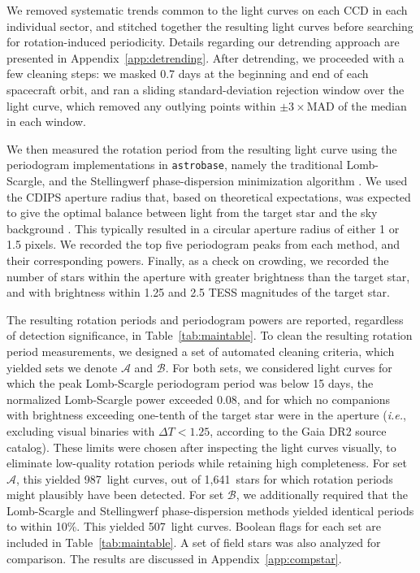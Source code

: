 \documentclass[12pt,twocolumn,tighten]{aastex63}
\newcommand{\nautorotdenominator}{1{,}641} %
\newcommand{\nautorotnumerator}{987} %
\newcommand{\nautorotnumeratormatching}{507} %
\begin{document}
We removed systematic trends common to the light curves on each
CCD in each individual sector, and stitched together the resulting
light curves before searching for rotation-induced periodicity.
Details regarding our detrending approach are presented in
Appendix~\ref{app:detrending}.  After detrending, we proceeded with a
few cleaning steps: we masked 0.7 days at the beginning and end of
each spacecraft orbit, and ran a sliding standard-deviation rejection
window over the light curve, which removed any outlying points within
$\pm3\times$MAD of the median in each window.

We then measured the rotation period from the resulting light curve
using the periodogram implementations in \texttt{astrobase}, namely
the traditional Lomb-Scargle, and the Stellingwerf phase-dispersion
minimization algorithm
\citep{lomb_1976,stellingwerf_period_1978,scargle_studies_1982,stellingwerf_period_2011,bhatti_astrobase_2018}.
We used the CDIPS aperture radius that, based on theoretical
expectations, was expected to give the optimal balance between light
from the target star and the sky background \citep{Sullivan_2015}.  This
typically resulted in a circular aperture radius of either 1 or 1.5 pixels.
We recorded the top five periodogram peaks from each method, and their
corresponding powers.  Finally, as a check on crowding, we recorded
the number of stars within the aperture with greater
brightness than the target star, and with brightness within 1.25 and
2.5 TESS magnitudes of the target star.

The resulting rotation periods and periodogram powers are reported,
regardless of detection significance, in Table~\ref{tab:maintable}.
To clean the resulting rotation period measurements, we designed a set
of automated cleaning criteria, which yielded sets we denote
$\mathcal{A}$ and $\mathcal{B}$.  For both sets, we considered light
curves for which the peak Lomb-Scargle periodogram period was below 15
days, the normalized Lomb-Scargle power exceeded 0.08, and for which
no companions with brightness exceeding one-tenth of the target star
were in the aperture ({\it i.e.}, excluding visual binaries
with $\Delta T < 1.25$, according to the Gaia DR2 source catalog).
These limits were chosen after inspecting the light curves visually,
to eliminate low-quality rotation periods while retaining high
completeness.  For set $\mathcal{A}$, this yielded \nautorotnumerator\
light curves, out of \nautorotdenominator\ stars for which rotation
periods might plausibly have been detected.  For set $\mathcal{B}$, we
additionally required that the Lomb-Scargle and Stellingwerf
phase-dispersion methods yielded identical periods to within 10\%.
This yielded \nautorotnumeratormatching\ light curves.  Boolean flags
for each set are included in Table~\ref{tab:maintable}.
A set of field stars was also analyzed for comparison.
The results are discussed in Appendix~\ref{app:compstar}.
\end{document}
